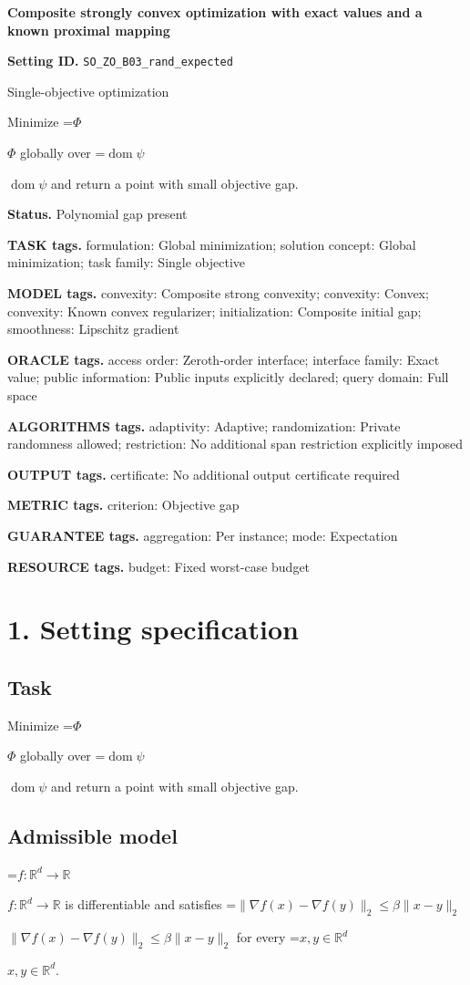 \documentclass[10pt,a4paper]{article}
\newcommand{\AtlasMath}[1]{\par\begingroup\centering\setbox0=\hbox{$\displaystyle #1$}\ifdim\wd0>1.4\linewidth\typeout{ATLAS WIDE FORMULA: \the\wd0}\fi\ifdim\wd0>\linewidth\resizebox{\linewidth}{!}{\box0}\else\box0\fi\par\endgroup}
\newcommand{\AtlasInlineMath}[1]{\begingroup\setbox0=\hbox{$#1$}\ifdim\wd0>.4\linewidth\endgroup\AtlasMath{#1}\else\endgroup$#1$\fi}
\begin{document}
\raggedright

{\LARGE\bfseries\sffamily\color{AtlasNavy} Composite strongly convex optimization with exact values and a known proximal mapping\par}\vspace{5pt}
\textbf{Setting ID.} \texttt{SO\_\allowbreak{}ZO\_\allowbreak{}B03\_\allowbreak{}rand\_\allowbreak{}expected}

Single-objective optimization

Minimize \AtlasInlineMath{\Phi} globally over \AtlasInlineMath{\operatorname{dom}\psi} and return a point with small objective gap.

\textbf{Status.} Polynomial gap present

\textbf{TASK tags.} formulation: Global minimization; solution concept: Global minimization; task family: Single objective

\textbf{MODEL tags.} convexity: Composite strong convexity; convexity: Convex; convexity: Known convex regularizer; initialization: Composite initial gap; smoothness: Lipschitz gradient

\textbf{ORACLE tags.} access order: Zeroth-order interface; interface family: Exact value; public information: Public inputs explicitly declared; query domain: Full space

\textbf{ALGORITHMS tags.} adaptivity: Adaptive; randomization: Private randomness allowed; restriction: No additional span restriction explicitly imposed

\textbf{OUTPUT tags.} certificate: No additional output certificate required

\textbf{METRIC tags.} criterion: Objective gap

\textbf{GUARANTEE tags.} aggregation: Per instance; mode: Expectation

\textbf{RESOURCE tags.} budget: Fixed worst-case budget

\section{1. Setting specification}
\subsection{Task}
Minimize \AtlasInlineMath{\Phi} globally over \AtlasInlineMath{\operatorname{dom}\psi} and return a point with small objective gap.

\subsection{Admissible model}
\AtlasInlineMath{f:\mathbb{R}^d\to\mathbb{R}} is differentiable and satisfies \AtlasInlineMath{\|\nabla f(x)-\nabla f(y)\|_2\le\beta\|x-y\|_2} for every \AtlasInlineMath{x,y\in\mathbb{R}^d}.
\end{document}
